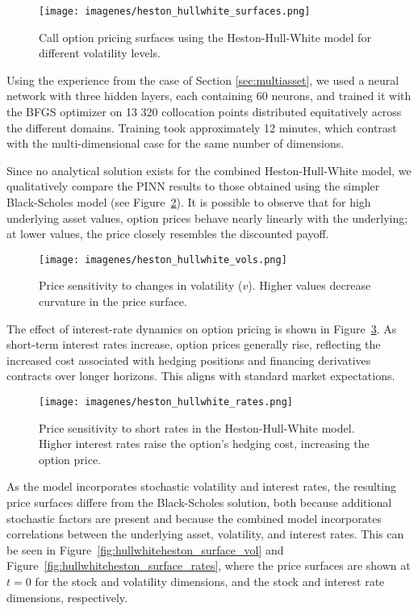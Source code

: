 \documentclass[12pt]{report} %
\theoremstyle{plain} %
\theoremstyle{definition} %
\theoremstyle{remark} %
\begin{document}
\begin{figure}[H]
	\centering
	\texttt{[image: imagenes/heston\_hullwhite\_surfaces.png]}
	\caption{Call option pricing surfaces using the Heston-Hull-White model for different volatility levels.}
	\label{fig:call_option_heston_hullwhite_surface}
\end{figure}

Using the experience from the case of Section \ref{sec:multiasset}, we used a neural network with three hidden layers, each containing 60 neurons,
and trained it with the BFGS optimizer on 13 320 collocation points distributed equitatively 
across the different domains. Training took approximately 12 minutes, which contrast with the multi-dimensional case for the same number of dimensions.

Since no analytical solution exists for the combined Heston-Hull-White model, 
we qualitatively compare the PINN results to those obtained using the simpler 
Black-Scholes model (see Figure~\ref{fig:heston_hullwhite_vols}). It is possible to observe that
for high underlying asset values, option prices behave nearly 
linearly with the underlying; at lower values, the price closely resembles the discounted 
payoff.

\begin{figure}[H]
	\centering
	\texttt{[image: imagenes/heston\_hullwhite\_vols.png]}
	\caption{Price sensitivity to changes in volatility ($v$). Higher 
	values decrease curvature in the price surface.}
	\label{fig:heston_hullwhite_vols}
\end{figure}

The effect of interest-rate dynamics on option pricing is shown in 
Figure~\ref{fig:heston_hullwhite_rates}. As short-term interest 
rates increase, option prices generally rise, reflecting the increased cost 
associated with hedging positions and financing derivatives contracts over 
longer horizons. This aligns with standard market expectations.

\begin{figure}[H]
	\centering
	\texttt{[image: imagenes/heston\_hullwhite\_rates.png]}
	\caption{Price sensitivity to short rates in the Heston-Hull-White model. Higher interest rates raise the option's hedging cost, increasing the option price.}
	\label{fig:heston_hullwhite_rates}
\end{figure}

As the model incorporates stochastic volatility and interest rates, the resulting price surfaces differe from the Black-Scholes solution,
both because additional stochastic factors are present and because the combined model incorporates correlations between the underlying asset, volatility, and interest rates.
This can be seen in Figure~\ref{fig:hullwhiteheston_surface_vol} and Figure~\ref{fig:hullwhiteheston_surface_rates}, where the price
surfaces are shown at $t=0$ for the stock and volatility dimensions, and the stock and interest rate dimensions, respectively.
\end{document}
